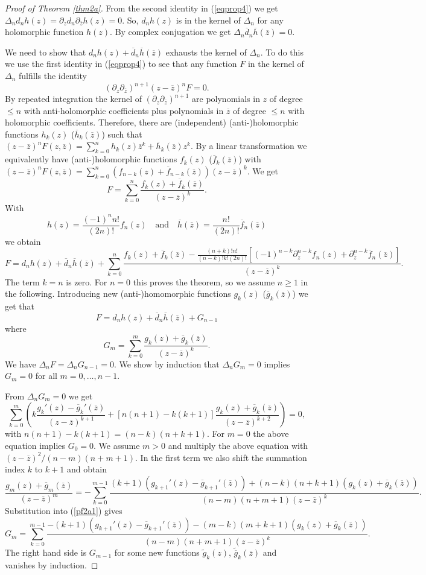 \documentclass[10pt,a4paper]{amsart}
\newcommand{\ddd}{{\overline{d}}}
\newcommand{\ff}{{\overline{f}}}
\newcommand{\gggg}{{\overline{g}}}
\newcommand{\hh}{{\overline{h}}}
\newcommand{\zz}{{\overline{z}}}
\begin{document}
\begin{proof}[Proof of Theorem \ref{thm2a}]
From the second identity in (\ref{eqprop4}) we get $\Delta_nd_nh(z)=\partial_zd_n\partial_\zz h(z)=0$. So, $d_nh(z)$ is in the kernel of $\Delta_n$ for any holomorphic function $h(z)$.
By complex conjugation we get $\Delta_n\ddd_n\hh(\zz)=0$.

We need to show that $d_nh(z)+\ddd_n\hh(\zz)$ exhausts the kernel of $\Delta_n$.
To do this we use the first identity in (\ref{eqprop4}) to see that any function $F$ in the kernel of $\Delta_n$ fulfills the identity
$$
(\partial_z\partial_\zz)^{n+1}(z-\zz)^nF=0.
$$
By repeated integration the kernel of $(\partial_z\partial_\zz)^{n+1}$ are polynomials in $z$ of degree $\leq n$ with anti-holomorphic coefficients plus polynomials in $\zz$ of degree $\leq n$
with holomorphic coefficients. Therefore, there are (independent) (anti-)holomorphic functions $h_k(z)$ ($\hh_k(\zz)$) such that $(z-\zz)^nF(z,\zz)=\sum_{k=0}^nh_k(z)\zz^k+\hh_k(\zz)z^k$.
By a linear transformation we equivalently have (anti-)holomorphic functions $f_k(z)$ ($\ff_k(\zz)$) with
$(z-\zz)^nF(z,\zz)=\sum_{k=0}^n(f_{n-k}(z)+\ff_{n-k}(\zz))(z-\zz)^k$. We get
$$
F=\sum_{k=0}^n\frac{f_k(z)+\ff_k(\zz)}{(z-\zz)^k}.
$$
With
$$
h(z)=\frac{(-1)^nn!}{(2n)!}f_n(z)\quad\text{and}\quad\hh(\zz)=\frac{n!}{(2n)!}\ff_n(\zz)
$$
we obtain
$$
F=d_nh(z)+\ddd_n\hh(\zz)+\sum_{k=0}^n\frac{f_k(z)+\ff_k(\zz)-\frac{(n+k)!n!}{(n-k)!k!(2n)!}[(-1)^{n-k}\partial_z^{n-k}f_n(z)+\partial_\zz^{n-k}\ff_n(\zz)]}{(z-\zz)^k}.
$$
The term $k=n$ is zero. For $n=0$ this proves the theorem, so we assume $n\geq1$ in the following.
Introducing new (anti-)homomorphic functions $g_k(z)$ ($\gggg_k(\zz)$) we get that
$$
F=d_nh(z)+\ddd_n\hh(\zz)+G_{n-1}
$$
where
\begin{equation}\label{pf2a1}
G_m=\sum_{k=0}^m\frac{g_k(z)+\gggg_k(\zz)}{(z-\zz)^k}.
\end{equation}
We have $\Delta_nF=\Delta_nG_{n-1}=0$. We show by induction that $\Delta_nG_m=0$ implies $G_m=0$ for all $m=0,\ldots,n-1$.

From $\Delta_nG_m=0$ we get
$$
\sum_{k=0}^m\left(k\frac{g_k'(z)-\gggg_k'(\zz)}{(z-\zz)^{k+1}}+[n(n+1)-k(k+1)]\frac{g_k(z)+\gggg_k(\zz)}{(z-\zz)^{k+2}}\right)=0,
$$
with $n(n+1)-k(k+1)=(n-k)(n+k+1)$. For $m=0$ the above equation implies $G_0=0$. We assume $m>0$ and multiply the above equation with $(z-\zz)^2/(n-m)(n+m+1)$.
In the first term we also shift the summation index $k$ to $k+1$ and obtain
$$
\frac{g_m(z)+\gggg_m(\zz)}{(z-\zz)^m}=-\sum_{k=0}^{m-1}\frac{(k+1)(g_{k+1}'(z)-\gggg_{k+1}'(\zz))+(n-k)(n+k+1)(g_k(z)+\gggg_k(\zz))}{(n-m)(n+m+1)(z-\zz)^k}.
$$
Substitution into (\ref{pf2a1}) gives
$$
G_m=\sum_{k=0}^{m-1}\frac{-(k+1)(g_{k+1}'(z)-\gggg_{k+1}'(\zz))-(m-k)(m+k+1)(g_k(z)+\gggg_k(\zz))}{(n-m)(n+m+1)(z-\zz)^k}.
$$
The right hand side is $G_{m-1}$ for some new functions $\widetilde{g}_k(z)$, $\widetilde{\gggg}_k(\zz)$ and vanishes by induction.
\end{proof}
\end{document}
